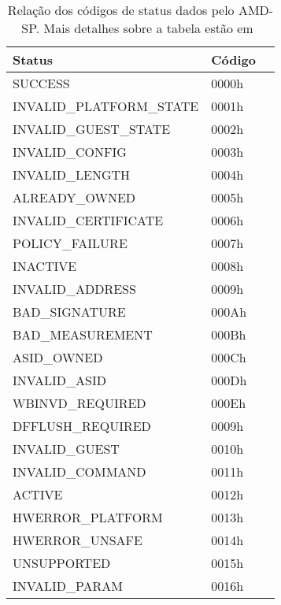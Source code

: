 \begin{table}[h]
    \centering
    \begin{tabular}{lll}
        \toprule
        Status  & Código\\
        \midrule
        SUCCESS & 0000h\\
        INVALID\_PLATFORM\_STATE & 0001h\\
        INVALID\_GUEST\_STATE & 0002h\\
        INVALID\_CONFIG & 0003h\\
        INVALID\_LENGTH & 0004h\\
        ALREADY\_OWNED & 0005h\\
        INVALID\_CERTIFICATE & 0006h\\
        POLICY\_FAILURE & 0007h\\
        INACTIVE & 0008h\\
        INVALID\_ADDRESS & 0009h\\
        BAD\_SIGNATURE & 000Ah\\
        BAD\_MEASUREMENT & 000Bh\\
        ASID\_OWNED & 000Ch\\
        INVALID\_ASID & 000Dh\\
        WBINVD\_REQUIRED & 000Eh\\
        DFFLUSH\_REQUIRED & 0009h\\
        INVALID\_GUEST & 0010h\\
        INVALID\_COMMAND & 0011h\\
        ACTIVE & 0012h\\
        HWERROR\_PLATFORM & 0013h\\
        HWERROR\_UNSAFE & 0014h\\
        UNSUPPORTED & 0015h\\
        INVALID\_PARAM & 0016h\\
        \bottomrule
    \end{tabular}
    \caption{Relação dos códigos de status dados pelo AMD-SP\@. Mais detalhes
             sobre a tabela estão
             em~\cite{sev-api-doc}}\label{cmdresp-status-code}
\end{table}

